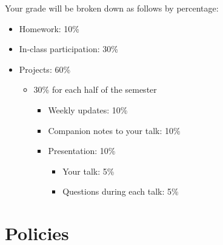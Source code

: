 \documentclass{article}
\begin{document}
Your grade will be broken down as follows by percentage:

\begin{itemize}

\item Homework: 10\%

\item In-class participation: 30\%

\item Projects: 60\%

\begin{itemize}
\item 30\% for each half of the semester

\begin{itemize}
\item Weekly updates: 10\%
\item Companion notes to your talk: 10\%
\item Presentation: 10\%
\begin{itemize}
\item Your talk: 5\%
\item Questions during each talk: 5\%
\end{itemize}
\end{itemize}

\end{itemize}

\end{itemize}


\section{Policies}
\end{document}
